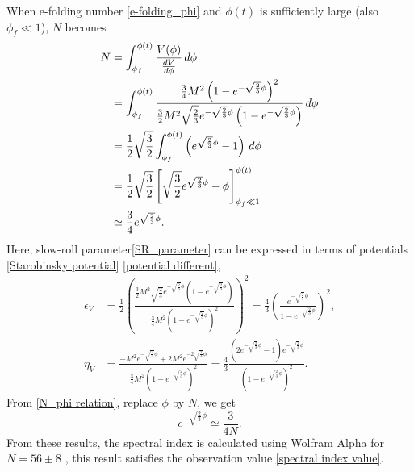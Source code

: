 \documentclass[12pt]{article}
\numberwithin{equation}{section}
\begin{document}
When e-folding number \eqref{e-folding_phi} and $\phi(t)$ is sufficiently large (also $\phi_f \ll 1$), $N$ becomes 
\begin{align}\label{N_phi relation}
    N &=  \int_{\phi_f}^{\phi(t)} \frac{V(\phi)}{\frac{dV}{d\phi}}\, d\phi \notag\\
    &= \int_{\phi_f}^{\phi(t)} \frac{\frac{3}{4}M^2 \left( 1 -  e^{-\sqrt{\frac{2}{3}}\phi} \right)^2}{\frac{3}{2}M^2 \sqrt{\frac{2}{3}}e^{-\sqrt{\frac{2}{3}}\phi}\left( 1 - e^{-\sqrt{\frac{2}{3}}\phi} \right)}\, d\phi \notag\\
    &= \frac{1}{2}\sqrt{\frac{3}{2}} \int_{\phi_f}^{\phi(t)} \left( e^{\sqrt{\frac{2}{3}}\phi} - 1 \right)\, d\phi \notag\\
    &= \frac{1}{2}\sqrt{\frac{3}{2}} \left[ \sqrt{\frac{3}{2}} e^{\sqrt{\frac{2}{3}}\phi} - \phi \right]^{\phi(t)}_{\phi_f \ll 1}\notag\\
    &\simeq \frac{3}{4} e^{\sqrt{\frac{2}{3}}\phi}.
\end{align}
Here, slow-roll parameter\eqref{SR_parameter} can be expressed in terms of potentials  \eqref{Starobinsky potential} \eqref{potential different},
\begin{align}
    \epsilon_V &= \frac{1}{2}\left( \frac{\frac{3}{2}M^2 \sqrt{\frac{2}{3}}e^{-\sqrt{\frac{2}{3}}\phi}\left( 1 - e^{-\sqrt{\frac{2}{3}}\phi} \right)}{\frac{3}{4}M^2 \left( 1 -  e^{-\sqrt{\frac{2}{3}}\phi} \right)^2} \right)^2 = \frac{4}{3}\left( \frac{e^{-\sqrt{\frac{2}{3}}\phi}}{1 -  e^{-\sqrt{\frac{2}{3}}\phi}} \right)^2, \\
    \eta_V &= \frac{-M^2 e^{-\sqrt{\frac{2}{3}}\phi} + 2M^2 e^{-2\sqrt{\frac{2}{3}}\phi}}{\frac{3}{4}M^2 \left( 1 -  e^{-\sqrt{\frac{2}{3}}\phi} \right)^2} = \frac{4}{3}\frac{\left( 2e^{-\sqrt{\frac{2}{3}}\phi} -1 \right)e^{-\sqrt{\frac{2}{3}}\phi}}{\left( 1 -  e^{-\sqrt{\frac{2}{3}}\phi} \right)^2}.
\end{align}
From \eqref{N_phi relation}, replace $\phi$ by $N$, we get
\begin{equation}
    e^{-\sqrt{\frac{2}{3}}\phi} \simeq \frac{3}{4N}.
\end{equation}
From these results, the spectral index is calculated using Wolfram Alpha for $N = 56 \pm 8$ \cite{Toyama:2024ugg}, this result satisfies the observation value \eqref{spectral index value}.
\end{document}
